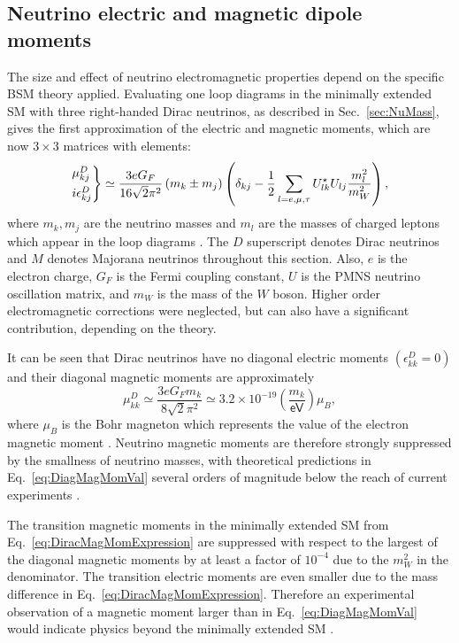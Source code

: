 \subsection{Neutrino electric and magnetic dipole moments}
The size and effect of neutrino electromagnetic properties depend on the specific \gls{BSM} theory applied. Evaluating one loop diagrams in the minimally extended \gls{SM} with three right-handed Dirac neutrinos, as described in Sec.~\ref{sec:NuMass}, gives the first approximation of the electric and magnetic moments, which are now $3\times 3$ matrices with elements:
\begin{equation}\label{eq:DiracMagMomExpression}
\begin{rcases}
\mu^D_{kj}\\
i\epsilon^D_{kj}
\end{rcases}
\simeq\frac{3eG_F}{16\sqrt{2}\pi^2}\left(m_k\pm m_j\right)\left(\delta_{kj}-\frac{1}{2}\sum_{l=e,\mu ,\tau}U^{\star}_{lk}U_{lj}\frac{m_l^2}{m_W^2}\right),
\end{equation}
where $m_k,m_j$ are the neutrino masses and $m_l$ are the masses of charged leptons which appear in the loop diagrams \cite{nuElmagInt2015.pdf}. The $D$ superscript denotes Dirac neutrinos and $M$ denotes Majorana neutrinos throughout this section. Also, $e$ is the electron charge, $G_F$ is the Fermi coupling constant, $U$ is the \gls{PMNS} neutrino oscillation matrix, and $m_W$ is the mass of the $W$ boson. Higher order electromagnetic corrections were neglected, but can also have a significant contribution, depending on the theory.

It can be seen that Dirac neutrinos have no diagonal electric moments $\left(\epsilon_{kk}^D=0\right)$ and their diagonal magnetic moments are approximately
\begin{equation}\label{eq:DiagMagMomVal}
\mu_{kk}^D\simeq\frac{3eG_Fm_k}{8\sqrt{2}\pi^2}\simeq 3.2\times 10^{-19}\left(\frac{m_k}{\textsf{eV}}\right)\mu_B,
\end{equation}
where $\mu_B$ is the Bohr magneton which represents the value of the electron magnetic moment \cite{nuElmagInt2015.pdf}. Neutrino magnetic moments are therefore strongly suppressed by the smallness of neutrino masses, with theoretical predictions in Eq.~\ref{eq:DiagMagMomVal} several orders of magnitude below the reach of current experiments \cite{NeutrinoPropertiesSnowmass2022.pdf}.

The transition magnetic moments in the minimally extended \gls{SM} from Eq.~\ref{eq:DiracMagMomExpression} are suppressed with respect to the largest of the diagonal magnetic moments by at least a factor of $10^{-4}$ due to the $m_W^2$ in the denominator. The transition electric moments are even smaller due to the mass difference in Eq.~\ref{eq:DiracMagMomExpression}. Therefore an experimental observation of a magnetic moment larger than in Eq.~\ref{eq:DiagMagMomVal} would indicate physics beyond the minimally extended \gls{SM} \cite{nuElmagInt2015.pdf,nuMMMajoranaBounds2006.pdf}.

